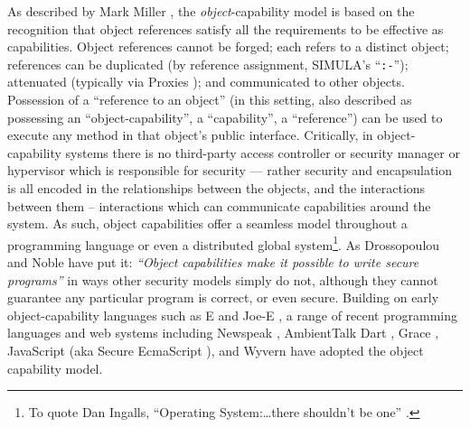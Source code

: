 As described by Mark Miller \cite{MillerPhD}, the
\textit{object}-capability model is based on the recognition that
object references satisfy all the requirements to be effective
as capabilities. Object references cannot be forged; each refers to a
distinct object; references can be duplicated (by reference
assignment, SIMULA's ``\texttt{:-}''); attenuated (typically via
Proxies \cite{gof,proxiesECOOP2013}); and communicated to other
objects. Possession of a ``reference to an object'' (in this setting,
also described as possessing an ``object-capability'', a
``capability'', a ``reference'') can be used to execute any method in
that object's public interface. Critically, in object-capability systems
there is no third-party access controller or security manager or
hypervisor which is responsible for security --- rather security and
encapsulation is all encoded in the relationships between the objects,
and the interactions between them -- interactions which can
communicate capabilities around the system.  As such, object
capabilities offer a seamless model throughout a programming language or
even a distributed global system\footnote{To quote Dan Ingalls,
``Operating System:\ldots there shouldn't be one''
\cite{ingalls1981}.}.  As Drossopoulou and Noble have put it:
\textit{``Object capabilities make it possible to write secure
  programs''} \cite{capeFTfJP} in ways other security models simply do
not, although they cannot guarantee any particular program is correct,
or even secure.
%
Building on early object-capability languages such as E
\cite{MillerPhD,ELang} and Joe-E \cite{JoeE}, 
a range of recent programming languages and web systems
\cite{CapJavaHayesAPLAS17,CapNetSocc17Eide,DOCaT14} including Newspeak
\cite{newspeak17},
AmbientTalk \cite{ambientTalk}
Dart \cite{dart15}, Grace \cite{grace,graceClasses},
JavaScript (aka Secure EcmaScript \cite{miller-esop2013}),
and Wyvern \cite{wyverncapabilities} have adopted the object
capability model.









